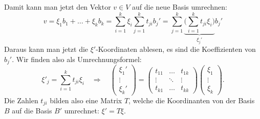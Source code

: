 Damit kann man jetzt den Vektor $v\in V$ auf die neue Basis umrechnen:
\[
v
=\xi_1b_1+\dots+\xi_kb_k
=\sum_{i=1}^k\xi_i\sum_{j=1}^kt_{ji}b_j'
=\sum_{j=1}^k\underbrace{\biggl( \sum_{i=1}^kt_{ji} \xi_i\biggr)}_{\xi_j'} b_j'
\]
Daraus kann man jetzt die $\xi'$-Koordinaten ablesen, es sind die
Koeffizienten von $b_j'$. Wir finden also als Umrechnungsformel:
\[
\xi'_j=\sum_{i=1}^kt_{ji}\xi_i
\quad\Rightarrow\quad
\begin{pmatrix}\xi_1'\\\vdots\\\xi_k'\end{pmatrix}
=
\begin{pmatrix}
t_{11}&\dots&t_{1k}\\
\vdots&\ddots&\vdots\\
t_{k1}&\dots&t_{kk}
\end{pmatrix}
\begin{pmatrix}\xi_1\\\vdots\\\xi_k \end{pmatrix}.
\]
Die Zahlen $t_{ji}$ bilden also eine Matrix $T$, welche die Koordinanten
von der Basis $B$ auf die Basis $B'$ umrechnet:
$\xi'=T\xi$.

